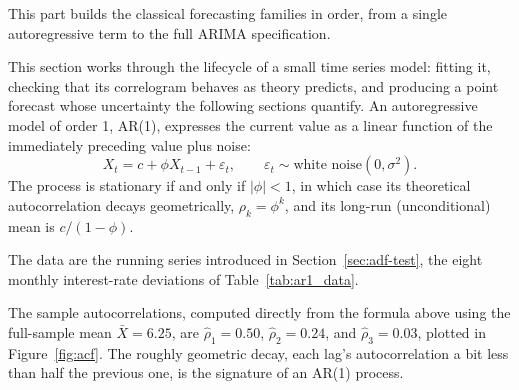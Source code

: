 \documentclass[../ai_in_finance]{subfiles}
\begin{document}
This part builds the classical forecasting families in order, from a single autoregressive term to the full ARIMA specification.

\label{sec:ar1-example}

This section works through the lifecycle of a small time series model: fitting it, checking that its correlogram behaves as theory predicts, and producing a point forecast whose uncertainty the following sections quantify. An autoregressive model of order 1, AR(1), expresses the current value as a linear function of the immediately preceding value plus noise:
\begin{equation}
\label{eq:timeseries-ar1}
X_t = c + \phi X_{t-1} + \varepsilon_t, \qquad \varepsilon_t \sim \text{white noise}(0, \sigma^2).
\end{equation}
The process is stationary if and only if $|\phi| < 1$, in which case its theoretical autocorrelation decays geometrically, $\rho_k = \phi^k$, and its long-run (unconditional) mean is $c/(1-\phi)$.

The data are the running series introduced in Section~\ref{sec:adf-test}, the eight monthly interest-rate deviations of Table~\ref{tab:ar1_data}.

The sample autocorrelations, computed directly from the formula above using the full-sample mean $\bar X = 6.25$, are $\hat\rho_1 = 0.50$, $\hat\rho_2 = 0.24$, and $\hat\rho_3 = 0.03$, plotted in Figure~\ref{fig:acf}. The roughly geometric decay, each lag's autocorrelation a bit less than half the previous one, is the signature of an AR(1) process.
\end{document}
